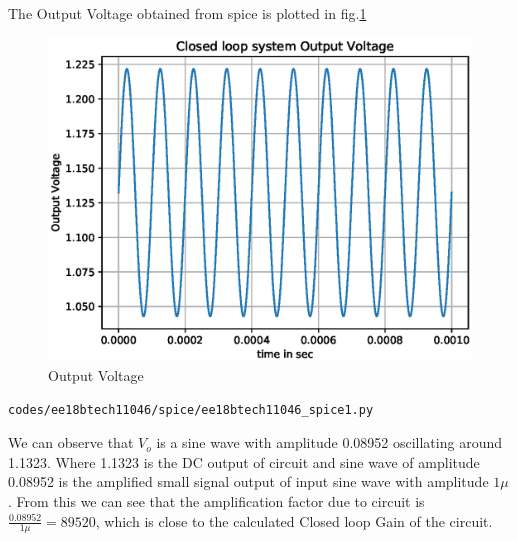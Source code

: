 \begin{enumerate}[label=\arabic*.,ref=\theenumi]
The Output Voltage obtained from spice is plotted in fig.\ref{fig:ee18btech11046_spice1}
%
\begin{figure}[!ht]
\centering
\includegraphics[width=\columnwidth]{./figs/ee18btech11046/ee18btech11046_1.eps}
\caption{Output Voltage}
\label{fig:ee18btech11046_spice1}
\end{figure}
%
\begin{lstlisting}
codes/ee18btech11046/spice/ee18btech11046_spice1.py
\end{lstlisting}
We can observe that $V_{o}$ is a sine wave with amplitude 0.08952 oscillating around 1.1323. Where 1.1323 is the DC output of circuit and sine wave of amplitude 0.08952 is the amplified small signal output of input sine wave with amplitude $1\mu$. From this we can see that the amplification factor due to circuit is $\frac{0.08952}{1\mu}=89520$, which is close to the calculated Closed loop Gain of the circuit. 

\end{enumerate}
